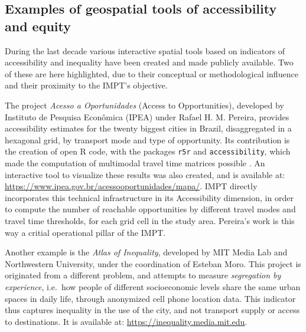\documentclass[
  authoryear,
  review,
  1p]{elsarticle}
\begin{document}
\subsection{Examples of geospatial tools of accessibility and
equity}\label{examples-of-geospatial-tools-of-accessibility-and-equity}

During the last decade various interactive spatial tools based on
indicators of accessibility and inequality have been created and made
publicly available. Two of these are here highlighted, due to their
conceptual or methodological influence and their proximity to the IMPT's
objective.

The project \emph{Acesso a Oportunidades} (Access to Opportunities),
developed by Instituto de Pesquisa Econômica (IPEA) under Rafael H. M.
Pereira, provides accessibility estimates for the twenty biggest cities
in Brazil, disaggregated in a hexagonal grid, by transport mode and type
of opportunity. Its contribution is the creation of open R code, with
the packages \texttt{r5r} and \texttt{accessibility}, which made the
computation of multimodal travel time matrices possible
\citep{Pereira_r5r_2021} \citep{Pereira_accessibility_2022}
\citep{Pereira_Herszenhut_2023}. An interactive tool to visualize these
results was also created, and is available at:
\url{https://www.ipea.gov.br/acessooportunidades/mapa/}. IMPT directly
incorporates this technical infrastructure in its Accessibility
dimension, in order to compute the number of reachable opportunities by
different travel modes and travel time thresholds, for each grid cell in
the study area. Pereira's work is this way a critial operational pillar
of the IMPT.

Another example is the \emph{Atlas of Inequality}, developed by MIT
Media Lab and Northwestern University, under the coordination of Esteban
Moro. This project is originated from a different problem, and attempts
to measure \emph{segregation by experience}, i.e.~how people of
different socioeconomic levels share the same urban spaces in daily
life, through anonymized cell phone location data. This indicator thus
captures inequality in the use of the city, and not transport supply or
access to destinations. It is available at:
\url{https://inequality.media.mit.edu}.
\end{document}
